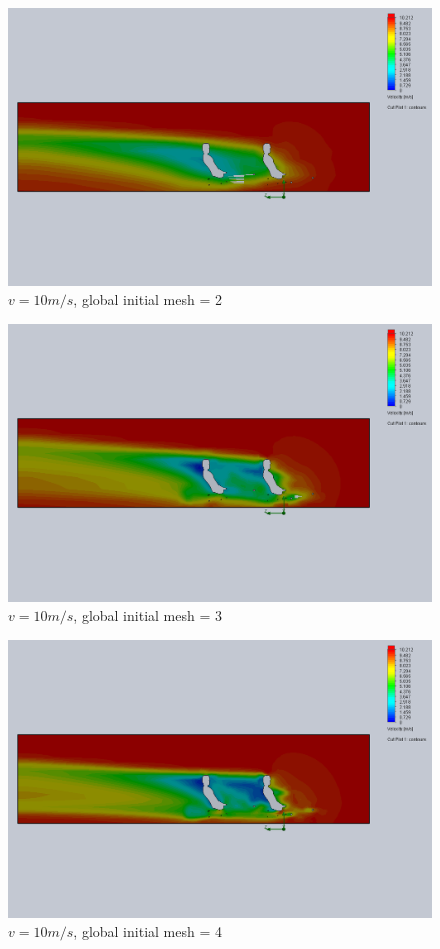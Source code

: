 \documentclass[11pt]{article}
\begin{document}
\begin{figure}
\includegraphics[width=\textwidth]{gm_2_rf_7_v10.png}
\caption{$v = 10 m/s$, global initial mesh = 2}
\end{figure}

\begin{figure}
\includegraphics[width=\textwidth]{gm_3_rf_7_v10.png}
\caption{$v = 10 m/s$, global initial mesh = 3}
\end{figure}

\begin{figure}
\includegraphics[width=\textwidth]{gm_4_rf_7_v10.png}
\caption{$v = 10 m/s$, global initial mesh = 4}
\end{figure}
\end{document}

